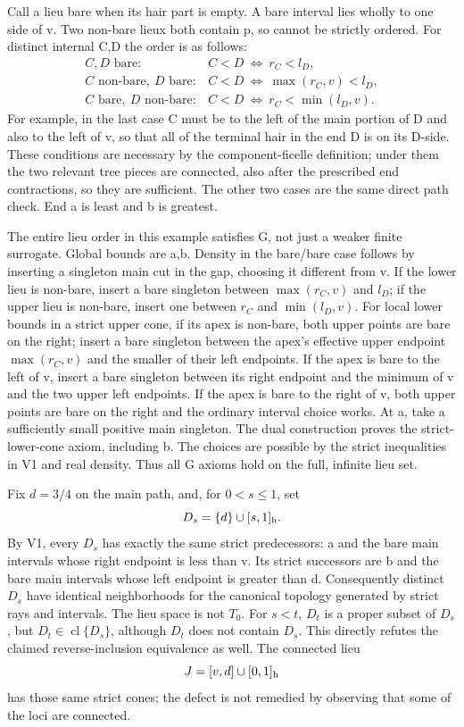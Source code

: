 Call a lieu bare when its hair part is empty. A bare interval lies wholly to one side of v. Two non-bare lieux both contain p, so cannot be strictly ordered. For distinct internal C,D the order is as follows:
\[
\begin{array}{ll}
C,D\text{ bare}:& C<D\ \Longleftrightarrow\ r_C<l_D,\\
C\text{ non-bare},\ D\text{ bare}:&
C<D\ \Longleftrightarrow\ \max(r_C,v)<l_D,\\
C\text{ bare},\ D\text{ non-bare}:&
C<D\ \Longleftrightarrow\ r_C<\min(l_D,v).
\end{array} \tag{V1}
\]
For example, in the last case C must be to the left of the main portion of D and also to the left of v, so that all of the terminal hair in the end D is on its D-side. These conditions are necessary by the component-ficelle definition; under them the two relevant tree pieces are connected, also after the prescribed end contractions, so they are sufficient. The other two cases are the same direct path check. End a is least and b is greatest.

The entire lieu order in this example satisfies G, not just a weaker finite surrogate. Global bounds are a,b. Density in the bare/bare case follows by inserting a singleton main cut in the gap, choosing it different from v. If the lower lieu is non-bare, insert a bare singleton between $\max(r_C,v)$ and $l_D$; if the upper lieu is non-bare, insert one between $r_C$ and $\min(l_D,v)$. For local lower bounds in a strict upper cone, if its apex is non-bare, both upper points are bare on the right; insert a bare singleton between the apex's effective upper endpoint $\max(r_C,v)$ and the smaller of their left endpoints. If the apex is bare to the left of v, insert a bare singleton between its right endpoint and the minimum of v and the two upper left endpoints. If the apex is bare to the right of v, both upper points are bare on the right and the ordinary interval choice works. At a, take a sufficiently small positive main singleton. The dual construction proves the strict-lower-cone axiom, including b. The choices are possible by the strict inequalities in V1 and real density. Thus all G axioms hold on the full, infinite lieu set.

Fix $d=3/4$ on the main path, and, for $0<s\leq1$, set
\[
 D_s=\{d\}\cup[s,1]_{\rm h}.
\]
By V1, every $D_s$ has exactly the same strict predecessors: a and the bare main intervals whose right endpoint is less than v. Its strict successors are b and the bare main intervals whose left endpoint is greater than d. Consequently distinct $D_s$ have identical neighborhoods for the canonical topology generated by strict rays and intervals. The lieu space is not $T_0$. For $s<t$, $D_t$ is a proper subset of $D_s$, but $D_t\in\operatorname{cl}\{D_s\}$, although $D_t$ does not contain $D_s$. This directly refutes the claimed reverse-inclusion equivalence as well. The connected lieu
\[
 J=[v,d]\cup[0,1]_{\rm h}
\]
has those same strict cones; the defect is not remedied by observing that some of the loci are connected.

